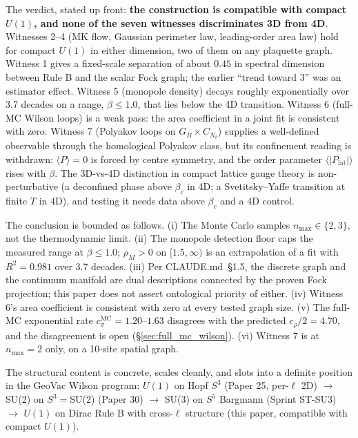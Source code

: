 \documentclass[11pt]{article}
\begin{document}
The verdict, stated up front: \textbf{the construction is compatible with
compact $U(1)$, and none of the seven witnesses discriminates 3D from 4D}.
Witnesses 2--4 (MK flow, Gaussian perimeter law, leading-order area law) hold
for compact $U(1)$ in either dimension, two of them on any plaquette graph.
Witness 1 gives a fixed-scale separation of about $0.45$ in spectral dimension
between Rule B and the scalar Fock graph; the earlier ``trend toward 3'' was
an estimator effect.  Witness 5 (monopole density) decays roughly
exponentially over 3.7 decades on a range, $\beta \le 1.0$, that lies below
the 4D transition.  Witness 6 (full-MC Wilson loops) is a weak pass: the
area coefficient in a joint fit is consistent with zero.  Witness 7
(Polyakov loops on $G_B\times C_{N_t}$) supplies a well-defined observable
through the homological Polyakov class, but its confinement reading is
withdrawn: $\langle P\rangle = 0$ is forced by centre symmetry, and the
order parameter $\langle |P_\text{lat}| \rangle$ rises with $\beta$.  The
3D-vs-4D distinction in compact lattice gauge theory is non-perturbative
(a deconfined phase above $\beta_c$ in 4D; a Svetitsky--Yaffe transition at
finite $T$ in 4D), and testing it needs data above $\beta_c$ and a 4D
control.

The conclusion is bounded as follows.  (i) The Monte Carlo samples
$n_\text{max}\in\{2,3\}$, not the thermodynamic limit.  (ii) The monopole
detection floor caps the measured range at $\beta\le 1.0$; $\rho_M>0$ on
$[1.5,\infty)$ is an extrapolation of a fit with $R^2=0.981$ over 3.7
decades.  (iii) Per CLAUDE.md~\S 1.5, the discrete graph and the continuum
manifold are dual descriptions connected by the proven Fock projection; this
paper does not assert ontological priority of either.  (iv) Witness 6's area
coefficient is consistent with zero at every tested graph size.  (v) The
full-MC exponential rate $c_\sigma^\text{MC}=1.20$--$1.63$ disagrees with
the predicted $c_\rho/2=4.70$, and the disagreement is open (\S\ref{sec:full_mc_wilson}).
(vi) Witness 7 is at $n_\text{max}=2$ only, on a 10-site spatial graph.

The structural content is concrete, scales cleanly, and slots into a definite
position in the GeoVac Wilson program:
$U(1)$ on Hopf $S^3$ (Paper 25, per-$\ell$ 2D)
$\to$ SU(2) on $S^3=$SU(2) (Paper 30)
$\to$ SU(3) on $S^5$ Bargmann (Sprint ST-SU3)
$\to$ $U(1)$ on Dirac Rule B with cross-$\ell$ structure (this paper, compatible with compact $U(1)$).

\end{document}
